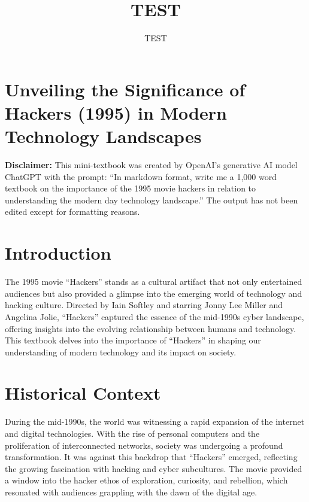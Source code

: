 \documentclass[
  openany]{book}
\title{TEST}
\author{TEST}
\date{}
\begin{document}
\maketitle

{
\setcounter{tocdepth}{1}
\tableofcontents
}
\hypertarget{unveiling-the-significance-of-hackers-1995-in-modern-technology-landscapes}{%
\chapter{Unveiling the Significance of Hackers (1995) in Modern Technology Landscapes}\label{unveiling-the-significance-of-hackers-1995-in-modern-technology-landscapes}}

\textbf{Disclaimer:} This mini-textbook was created by OpenAI's generative AI model ChatGPT with the prompt: ``In markdown format, write me a 1,000 word textbook on the importance of the 1995 movie hackers in relation to understanding the modern day technology landscape.'' The output has not been edited except for formatting reasons.

\hypertarget{introduction}{%
\chapter{Introduction}\label{introduction}}

The 1995 movie ``Hackers'' stands as a cultural artifact that not only entertained audiences but also provided a glimpse into the emerging world of technology and hacking culture. Directed by Iain Softley and starring Jonny Lee Miller and Angelina Jolie, ``Hackers'' captured the essence of the mid-1990s cyber landscape, offering insights into the evolving relationship between humans and technology. This textbook delves into the importance of ``Hackers'' in shaping our understanding of modern technology and its impact on society.

\hypertarget{historical-context}{%
\chapter{Historical Context}\label{historical-context}}

During the mid-1990s, the world was witnessing a rapid expansion of the internet and digital technologies. With the rise of personal computers and the proliferation of interconnected networks, society was undergoing a profound transformation. It was against this backdrop that ``Hackers'' emerged, reflecting the growing fascination with hacking and cyber subcultures. The movie provided a window into the hacker ethos of exploration, curiosity, and rebellion, which resonated with audiences grappling with the dawn of the digital age.
\end{document}
